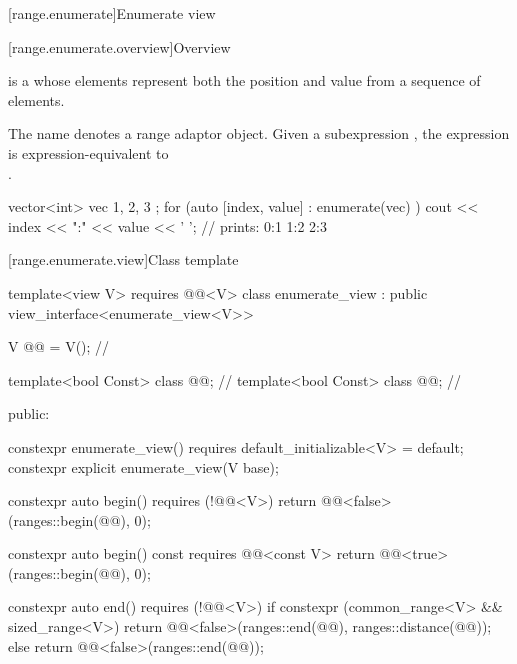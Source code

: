 \documentclass{wg21}
\begin{document}
\begin{addedblock}



[range.enumerate]{Enumerate view}

[range.enumerate.overview]{Overview}

\pnum
{} is a  whose elements represent both the position and value from a sequence of elements.

\pnum
The name  denotes a
range adaptor object.
Given a subexpression ,
the expression  is expression-equivalent to \\
.

\pnum
\begin{example}
\begin{codeblock}
vector<int> vec{ 1, 2, 3 };
for (auto [index, value] : enumerate(vec) )
    cout << index << ":" << value << ' '; // prints: 0:1 1:2 2:3
\end{codeblock}
\end{example}


[range.enumerate.view]{Class template }


\begin{codeblock}
    template<view V>
    requires @@<V>
    class enumerate_view : public view_interface<enumerate_view<V>> {

        V @@ = V(); // \expos

        template<bool Const>
        class @@; // \expos
        template<bool Const>
        class @@; // \expos

       public:

        constexpr enumerate_view() requires default_­initializable<V> = default;
        constexpr explicit enumerate_view(V base);

        constexpr auto begin() requires (!@@<V>)
        { return @@<false>(ranges::begin(@@), 0); }

        constexpr auto begin() const requires @@<const V>
        { return @@<true>(ranges::begin(@@), 0); }

        constexpr auto end() requires (!@@<V>) {
          if constexpr (common_range<V> && sized_range<V>)
        	return @@<false>(ranges::end(@@), ranges::distance(@@));
          else
        	return @@<false>(ranges::end(@@));
         }

}
\end{codeblock}
\end{addedblock}
\end{document}
